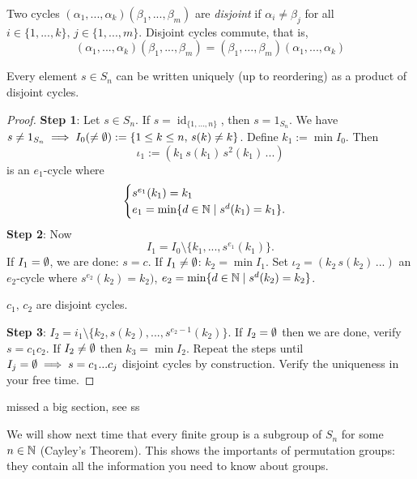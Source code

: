 \begin{definition}
    Two cycles $(\alpha_1,...,\alpha_k)(\beta_1,...,\beta_m)$ are \emph{disjoint} if $\alpha_i \neq \beta_j$ for all $i \in \{1,...,k\}, \, j \in \{1,...,m\}$. 
    Disjoint cycles commute, that is, \[
        (\alpha_1,...,\alpha_k)(\beta_1,...,\beta_m)=(\beta_1,...,\beta_m)(\alpha_1,...,\alpha_k)
    \]
\end{definition}
\begin{lemma}
    Every element $s\in S_n$ can be written uniquely (up to reordering) as a product of disjoint cycles.
\end{lemma}
\begin{proof}
    \textbf{Step 1}: Let $s\in S_n$. If $s=\operatorname{id}_{\{1,...,n\} }$, then $s=1_{S_n}$. We have $s \neq 1_{S_n} \implies I_0 (\neq \emptyset) := \{1 \leq k \leq n, \, s(k) \neq k\} $. Define $k_1 := \operatorname{min}I_0.$ Then \[
        \iota_1 := ( k_1 \,s(k_1) \, s^2(k_1)\, ... ) 
    \]
   is an $e_1$-cycle where \[
   \begin{cases}
       s^{e_1}(k_1) =k_1 \\
       e_1=\operatorname{min} \{d \in \mathbb{N}  \mid s^{d}(k_1)=k_1\}.
   \end{cases}
   \]
   \textbf{Step 2}: Now \[
       I_1=I_0\setminus \{k_1,...,s^{e_1}(k_1)\}.
   \]
   If $I_1=\emptyset$, we are done: $s = c.$ If $I_1\neq\emptyset$: $k_2=\operatorname{min}I_1$. Set $\iota_2=(k_2\,s(k_2)\,...)$ an $e_2$-cycle where $s^{e_2}(k_2)=k_2)$, $e_2=\operatorname{min}\{d\in \mathbb{N} \mid s^{d}(k_2)=k_2\} $. 
   \begin{note}
       $c_1, \, c_2$ are disjoint cycles.
   \end{note}
   \textbf{Step 3}: $I_2=i_1\setminus \{k_2,s(k_2),...,s^{e_2-1}(k_2)\} $. If $I_2=\emptyset$ then we are done, verify $s=c_1c_2$. If $I_2\neq\emptyset$ then $k_3=\operatorname{min}I_2$. Repeat the steps until $I_j = \emptyset \implies s=c_1 ... c_j$ disjoint cycles by construction. Verify the uniqueness in your free time.
\end{proof}
missed a big section, see ss
\begin{note}
    We will show next time that every finite group is a subgroup of $S_n$ for some $n\in \mathbb{N}$ (Cayley's Theorem). This shows the importants of permutation groups: they contain all the information you need to know about groups.
\end{note}




